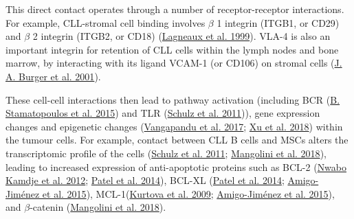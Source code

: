 \documentclass[11pt, a4paper, twosided]{book}
\begin{document}
This direct contact operates through a number of receptor-receptor interactions. For example, CLL-stromal cell binding involves \(\beta\) 1 integrin (ITGB1, or CD29) and \(\beta\) 2 integrin (ITGB2, or CD18) (\protect\hyperlink{ref-Lagneaux1999}{Lagneaux et al. 1999}). VLA-4 is also an important integrin for retention of CLL cells within the lymph nodes and bone marrow, by interacting with its ligand VCAM-1 (or CD106) on stromal cells (\protect\hyperlink{ref-Burger2001}{J. A. Burger et al. 2001}).

These cell-cell interactions then lead to pathway activation (including BCR (\protect\hyperlink{ref-Stamatopoulos2015}{B. Stamatopoulos et al. 2015}) and TLR (\protect\hyperlink{ref-Schulz2011}{Schulz et al. 2011})), gene expression changes and epigenetic changes (\protect\hyperlink{ref-Vangapandu2017}{Vangapandu et al. 2017}; \protect\hyperlink{ref-Xu2018}{Xu et al. 2018}) within the tumour cells. For example, contact between CLL B cells and MSCs alters the transcriptomic profile of the cells (\protect\hyperlink{ref-Schulz2011}{Schulz et al. 2011}; \protect\hyperlink{ref-Mangolini2018}{Mangolini et al. 2018}), leading to increased expression of anti-apoptotic proteins such as BCL-2 (\protect\hyperlink{ref-Nwabo2012}{Nwabo Kamdje et al. 2012}; \protect\hyperlink{ref-Patel2014}{Patel et al. 2014}), BCL-XL (\protect\hyperlink{ref-Patel2014}{Patel et al. 2014}; \protect\hyperlink{ref-AmigoJimenez2015}{Amigo-Jiménez et al. 2015}), MCL-1(\protect\hyperlink{ref-Kurtova2009}{Kurtova et al. 2009}; \protect\hyperlink{ref-AmigoJimenez2015}{Amigo-Jiménez et al. 2015}), and \(\beta\)-catenin (\protect\hyperlink{ref-Mangolini2018}{Mangolini et al. 2018}).
\end{document}
